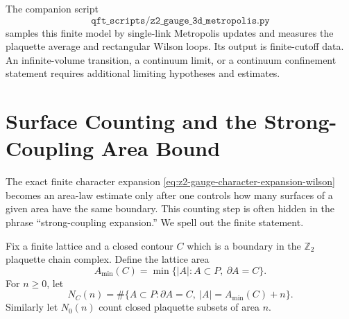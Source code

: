 The companion script
\[
  \texttt{qft\_scripts/z2\_gauge\_3d\_metropolis.py}
\]
samples this finite model by single-link Metropolis updates and measures the
plaquette average and rectangular Wilson loops.  Its output is finite-cutoff
data.  An infinite-volume transition, a continuum limit, or a continuum
confinement statement requires additional limiting hypotheses and estimates.

\section{Surface Counting and the Strong-Coupling Area Bound}

The exact finite character expansion
\eqref{eq:z2-gauge-character-expansion-wilson} becomes an area-law
estimate only after one controls how many surfaces of a given area have the
same boundary.  This counting step is often hidden in the phrase
``strong-coupling expansion.''  We spell out the finite statement.

Fix a finite lattice and a closed contour \(C\) which is a boundary in the
\(\mathbb Z_2\) plaquette chain complex.  Define the lattice area
\begin{equation}
  A_{\min}(C)
  =
  \min\{|A|:A\subset P,\ \partial A=C\}.
  \label{eq:z2-minimal-lattice-area}
\end{equation}
For \(n\geq0\), let
\begin{equation}
  N_C(n)
  =
  \#\{A\subset P:\partial A=C,\ |A|=A_{\min}(C)+n\}.
  \label{eq:z2-surface-counting-number}
\end{equation}
Similarly let \(N_0(n)\) count closed plaquette subsets of area \(n\).


